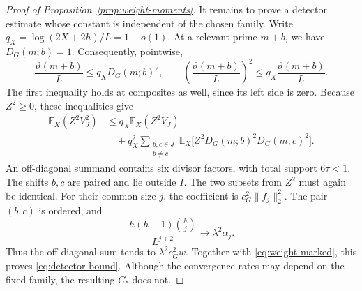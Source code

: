 \begin{proof}[Proof of Proposition~\ref{prop:weight-moments}]
It remains to prove a detector estimate whose constant is independent
of the chosen family.  Write $q_X=\log(2X+2h)/L=1+o(1)$.  At a
relevant prime $m+b$, we have $D_G(m;b)=1$.  Consequently, pointwise,
\[
 \frac{\vartheta(m+b)}L\le q_XD_G(m;b)^2,
 \qquad
 \left(\frac{\vartheta(m+b)}L\right)^2
       \le q_X\frac{\vartheta(m+b)}L.
\]
The first inequality holds at composites as well, since its left side
is zero.  Because $Z^2\ge0$, these inequalities give
\begin{align*}
 \mathbb E_X(Z^2V_J^2)
 &\le q_X\mathbb E_X(Z^2V_J)\\
 &\quad+q_X^2\sum_{\substack{b,c\in J\\b\ne c}}
       \mathbb E_X\bigl[Z^2 D_G(m;b)^2D_G(m;c)^2\bigr].
\end{align*}
An off-diagonal summand contains six divisor factors, with total
support $6\tau<1$.  The shifts $b,c$ are paired and lie outside $I$.
The two subsets from $Z^2$ must again be identical.  For their common
size $j$, the coefficient is $c_G^2\|f_j\|_2^2$.  The pair $(b,c)$ is
ordered, and
\[
 \frac{h(h-1)\binom hj}{L^{j+2}}
      \longrightarrow\lambda^2\alpha_j.
\]
Thus the off-diagonal sum tends to $\lambda^2c_G^2w$.
Together with \eqref{eq:weight-marked}, this proves
\eqref{eq:detector-bound}.  Although the convergence rates may depend
on the fixed family, the resulting $C_*$ does not.
\end{proof}
